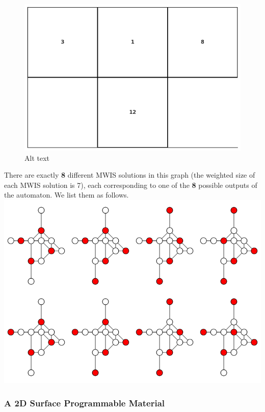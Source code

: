 \documentclass[twocolumn,superscriptaddress,english,showpacs,longbibliography]{revtex4-2}
\begin{document}
\begin{figure}
\centering
\includegraphics[width=\columnwidth]{../notes/images/rule110.png}
\caption{Alt text}
\end{figure}

There are exactly \textbf{8} different MWIS solutions in this graph (the
weighted size of each MWIS solution is 7), each corresponding to one of
the \textbf{8} possible outputs of the automaton. We list them as
follows.
\includegraphics[width=\columnwidth]{../notes/images/gadget110.png}

\subsubsection{A 2D Surface Programmable
Material}\label{a-2d-surface-programmable-material}
\end{document}
